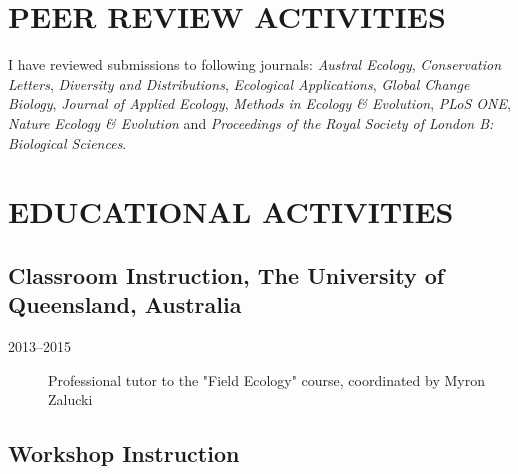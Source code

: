 \documentclass[12pt,a4paper]{article}
\begin{document}
\section*{PEER REVIEW ACTIVITIES}

I have reviewed submissions to following journals: \textit{Austral Ecology}, \textit{Conservation Letters}, \textit{Diversity and Distributions}, \textit{Ecological Applications}, \textit{Global Change Biology}, \textit{Journal of Applied Ecology}, \textit{Methods in Ecology \& Evolution}, \textit{PLoS ONE}, \textit{Nature Ecology \& Evolution} and \textit{Proceedings of the Royal Society of London B: Biological Sciences}.

\section*{EDUCATIONAL ACTIVITIES}

\subsection*{Classroom Instruction, The University of Queensland, Australia}

\begin{description}

\item[2013--2015] Professional tutor to the "Field Ecology" course, coordinated by Myron Zalucki

\end{description}

\subsection*{Workshop Instruction}
\end{document}
